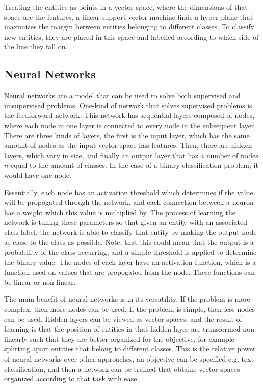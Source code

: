 Treating the entities as points in a vector space, where the dimensions of that space are the features,  a linear support vector machine  finds a hyper-plane that maximizes the margin between entities belonging to different classes. To classify new entities, they are placed in this space and labelled according to which side of the line they fall on. %




\subsection{Neural Networks}\label{bg:nn}

Neural networks are a model that can be used to solve both supervised and unsupervised problems. One-kind of network that solves supervised problems is the feedforward network. This network has sequential layers composed of nodes, where each node in one layer is connected to every node in the subsequent layer. There are three kinds of layers, the first is the input layer, which has the same amount of nodes as the input vector space has features. Then, there are hidden-layers, which vary in size, and finally an output layer that has a number of nodes $n$ equal to the amount of classes. In the case of a binary classification problem, it would have one node.

Essentially, each node has an activation threshold which determines if the value will be propogated through the network, and each connection between a neuron has a weight which this value is multiplied by. The process of learning the network is tuning these parameters so that given an entity with an associated class label, the network is able to classify that entity by making the output node as close to the class as possible. Note, that this could mean that the output is a probability of the class occurring, and a simple threshold is applied to determine the binary value. The nodes of each layer have an activation function, which is a function used on values that are propogated from the node. These functions can be linear or non-linear.

The main benefit of neural networks is in its versatility. If the problem is more complex, then more nodes can be used. If the problem is simple, then less nodes can be used. Hidden layers can be viewed as vector spaces, and the result of learning is that the position of entities in that hidden layer are transformed non-linearly such that they are better organized for the objective, for example splitting apart entities that belong to different classes. This is the relative power of neural networks over other approaches, an objective can be specified e.g. text classification, and then a  network can be trained that obtains  vector spaces organized according to that task with ease.  

